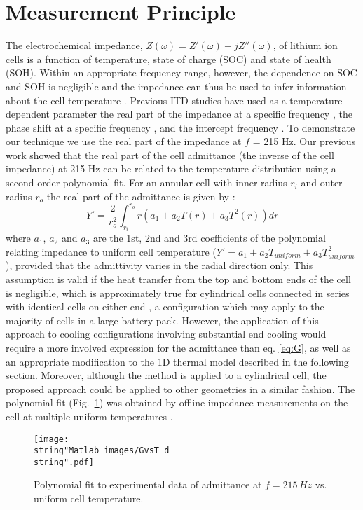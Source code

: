 \documentclass[journal, english]{IEEEtran}
\begin{document}
\section{Measurement Principle}
The electrochemical impedance, $Z\left(\omega\right)=Z'\left(\omega\right)+jZ''\left(\omega\right)$, of lithium ion cells is a function of temperature, state of charge
(SOC) and state of health (SOH). Within an appropriate frequency
range, however, the dependence on SOC and SOH is negligible
and the impedance can thus be used to infer information about the
cell temperature \cite{Srinivasan2011c}. Previous ITD studies have
used as a temperature-dependent parameter the real part of the impedance
at a specific frequency \cite{Schmidt2013a}, the phase shift at a
specific frequency \cite{Srinivasan2011c,Srinivasan2012a}, and the
intercept frequency \cite{Raijmakers2014d}. To demonstrate our technique
we use the real part of the impedance at $f$ = 215 Hz. Our previous
work showed that the real part of the cell admittance (the inverse
of the cell impedance) at 215 Hz can be related to the temperature
distribution using a second order polynomial fit. For an annular cell
with inner radius $r_{i}$ and outer radius $r_{o}$ the real part  of the admittance
is given by \cite{Richardson2014}:
\begin{equation}
Y'=\frac{2}{r_{o}^{2}}\int_{r_{i}}^{r_{o}}r\left(a_{1}+a_{2}T(r)+a_{3}T^{2}(r)\right)dr\label{eq:G}
\end{equation}
where $a_{1}$, $a_{2}$ and $a_{3}$ are the 1st, 2nd and 3rd coefficients
of the polynomial relating impedance to uniform cell temperature ($Y'=a_{1}+a_{2}T_{uniform}+a_{3}T_{uniform}^{2}$),
provided that the admittivity varies in the radial direction only.
This assumption is valid if the heat transfer from the top and bottom
ends of the cell is negligible, which is approximately true for cylindrical
cells connected in series with identical cells on either end \cite{Fleckenstein2011},
a configuration which may apply to the majority of cells in a large
battery pack.
However, the application of this approach to cooling configurations involving substantial end cooling would require a more involved expression for the admittance than  eq. \ref{eq:G}, as well as an appropriate modification to the 1D thermal model described in the following section.
Moreover, although the method is applied to a cylindrical cell, the proposed approach could be applied to other geometries in a similar fashion.
The polynomial fit (Fig.\ \ref{fig:Polynomial-fit})
was obtained by offline impedance measurements on the cell at multiple
uniform temperatures \cite{Richardson2014}.
\begin{figure}[h]
\begin{centering}
\texttt{[image: \\string"Matlab images/GvsT\_d\\string".pdf]}
\par\end{centering}
\caption{Polynomial fit to experimental data of admittance at $f=215\, Hz$
vs. uniform cell temperature.\label{fig:Polynomial-fit}}
\end{figure}
\end{document}
